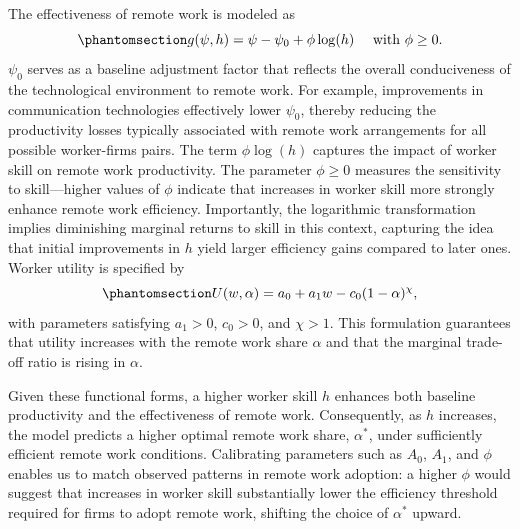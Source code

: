 \documentclass[
  11pt,
  letterpaper,
  DIV=11,
  numbers=noendperiod]{scrartcl}
\theoremstyle{plain}
\theoremstyle{remark}
\begin{document}
The effectiveness of remote work is modeled
as\begin{equation}\phantomsection\label{eq-remote-efficiency-example}{
g(\psi,h)=\psi-\psi_0+\phi\log(h) \quad \text{ with }\phi\ge0.}\end{equation}
\(\psi_0\) serves as a baseline adjustment factor that reflects the
overall conduciveness of the technological environment to remote work.
For example, improvements in communication technologies effectively
lower \(\psi_0\), thereby reducing the productivity losses typically
associated with remote work arrangements for all possible worker-firms
pairs. The term \(\phi \log(h)\) captures the impact of worker skill on
remote work productivity. The parameter \(\phi \ge 0\) measures the
sensitivity to skill---higher values of \(\phi\) indicate that increases
in worker skill more strongly enhance remote work efficiency.
Importantly, the logarithmic transformation implies diminishing marginal
returns to skill in this context, capturing the idea that initial
improvements in \(h\) yield larger efficiency gains compared to later
ones. Worker utility is specified
by\begin{equation}\phantomsection\label{eq-utility-function}{
U(w,\alpha)=a_0+a_1w-c_0(1-\alpha)^\chi,}\end{equation} with parameters
satisfying \(a_1>0\), \(c_0>0\), and \(\chi>1\). This formulation
guarantees that utility increases with the remote work share \(\alpha\)
and that the marginal trade-off ratio is rising in \(\alpha\).

Given these functional forms, a higher worker skill \(h\) enhances both
baseline productivity and the effectiveness of remote work.
Consequently, as \(h\) increases, the model predicts a higher optimal
remote work share, \(\alpha^*\), under sufficiently efficient remote
work conditions. Calibrating parameters such as \(A_0\), \(A_1\), and
\(\phi\) enables us to match observed patterns in remote work adoption:
a higher \(\phi\) would suggest that increases in worker skill
substantially lower the efficiency threshold required for firms to adopt
remote work, shifting the choice of \(\alpha^*\) upward.
\end{document}

